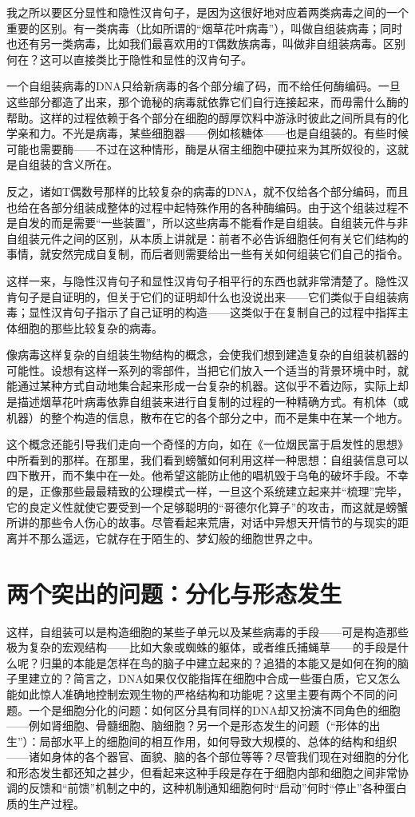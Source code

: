 我之所以要区分显性和隐性汉肯句子，是因为这很好地对应着两类病毒之间的一个重要的区别。有一类病毒（比如所谓的“烟草花叶病毒”），叫做自组装病毒；同时也还有另一类病毒，比如我们最喜欢用的T偶数族病毒，叫做非自组装病毒。区别何在？这可以直接类比于隐性和显性的汉肯句子。

一个自组装病毒的DNA只给新病毒的各个部分编了码，而不给任何酶编码。一旦这些部分都造了出来，那个诡秘的病毒就依靠它们自行连接起来，而毋需什么酶的帮助。这样的过程依赖于各个部分在细胞的醇厚饮料中游泳时彼此之间所具有的化学亲和力。不光是病毒，某些细胞器——例如核糖体——也是自组装的。有些时候可能也需要酶——不过在这种情形，酶是从宿主细胞中硬拉来为其所奴役的，这就是自组装的含义所在。

反之，诸如T偶数号那样的比较复杂的病毒的DNA，就不仅给各个部分编码，而且也给在各部分组装成整体的过程中起特殊作用的各种酶编码。由于这个组装过程不是自发的而是需要“一些装置”，所以这些病毒不能看作是自组装。自组装元件与非自组装元件之间的区别，从本质上讲就是：前者不必告诉细胞任何有关它们结构的事情，就安然完成自复制，而后者则需要给出一些有关如何组装它们自己的指令。

这样一来，与隐性汉肯句子和显性汉肯句子相平行的东西也就非常清楚了。隐性汉肯句子是自证明的，但关于它们的证明却什么也没说出来——它们类似于自组装病毒；显性汉肯句子指示了自己证明的构造——这类似于在复制自己的过程中指挥主体细胞的那些比较复杂的病毒。

像病毒这样复杂的自组装生物结构的概念，会使我们想到建造复杂的自组装机器的可能性。设想有这样一系列的零部件，当把它们放入一个适当的背景环境中时，就能通过某种方式自动地集合起来形成一台复杂的机器。这似乎不着边际，实际上却是描述烟草花叶病毒依靠自组装来进行自复制的过程的一种精确方式。有机体（或机器）的整个构造的信息，散布在它的各个部分之中，而不是集中在某一个地方。

这个概念还能引导我们走向一个奇怪的方向，如在《一位烟民富于启发性的思想》中所看到的那样。在那里，我们看到螃蟹如何利用这样一种思想：自组装信息可以四下散开，而不集中在一处。他希望这能防止他的唱机毁于乌龟的破坏手段。不幸的是，正像那些最最精致的公理模式一样，一旦这个系统建立起来并“梳理”完毕，它的良定义性就使它要受到一个足够聪明的“哥德尔化算子”的攻击，而这就是螃蟹所讲的那些令人伤心的故事。尽管看起来荒唐，对话中异想天开情节的与现实的距离并不那么遥远，它就存在于陌生的、梦幻般的细胞世界之中。

\section{两个突出的问题：分化与形态发生}

这样，自组装可以是构造细胞的某些子单元以及某些病毒的手段——可是构造那些极为复杂的宏观结构——比如大象或蜘蛛的躯体，或者维氏捕蝇草——的手段是什么呢？归巢的本能是怎样在鸟的脑子中建立起来的？追猎的本能又是如何在狗的脑子里建立的？简言之，DNA如果仅仅能指挥在细胞中合成一些蛋白质，它又怎么能如此惊人准确地控制宏观生物的严格结构和功能呢？这里主要有两个不同的问题。一个是细胞分化的问题：如何区分具有同样的DNA却又扮演不同角色的细胞——例如肾细胞、骨髓细胞、脑细胞？另一个是形态发生的问题（“形体的出生”）：局部水平上的细胞间的相互作用，如何导致大规模的、总体的结构和组织——诸如身体的各个器官、面貌、脑的各个部位等等？尽管我们现在对细胞的分化和形态发生都还知之甚少，但看起来这种手段是存在于细胞内部和细胞之间非常协调的反馈和“前馈”机制之中的，这种机制通知细胞何时“启动”何时“停止”各种蛋白质的生产过程。

